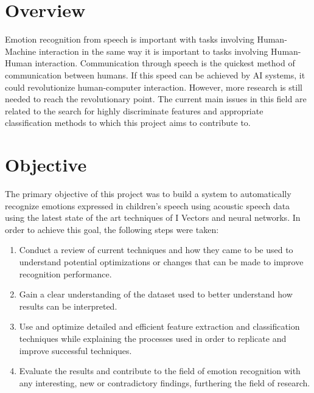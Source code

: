 \section{Overview}
	Emotion recognition from speech is important with tasks involving Human-Machine interaction in the same way it is important to tasks involving Human-Human interaction. Communication through speech is the quickest method of communication between humans. If this speed can be achieved by AI systems, it could revolutionize human-computer interaction. However, more research is still needed to reach the revolutionary point. The current main issues in this field are related to the search for highly discriminate features and appropriate classification methods to which this project aims to contribute to.
\section{Objective}
	The primary objective of this project was to build a system to automatically recognize emotions expressed in children's speech using acoustic speech data using the latest state of the art techniques of I Vectors and neural networks. In order to achieve this goal, the following steps were taken:
	\begin{enumerate}
		\item Conduct a review of current techniques and how they came to be used to understand potential optimizations or changes that can be made to improve recognition performance.
		\item Gain a clear understanding of the dataset used to better understand how results can be interpreted.
		\item Use and optimize detailed and efficient feature extraction and classification techniques while explaining the processes used in order to replicate and improve successful techniques.
		\item Evaluate the results and contribute to the field of emotion recognition with any interesting, new or contradictory findings, furthering the field of research.
	\end{enumerate}
	